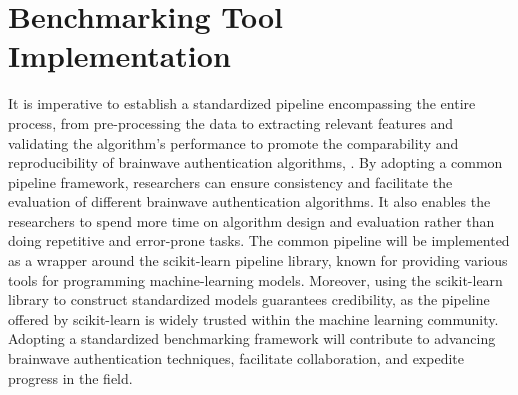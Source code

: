 \chapter{Benchmarking Tool Implementation}
\label{ch:Framework}

It is imperative to establish a standardized pipeline encompassing the entire process, from pre-processing the data to extracting relevant features and validating the algorithm's performance to promote the comparability and reproducibility of brainwave authentication algorithms, \cite{moabb}. By adopting a common pipeline framework, researchers can ensure consistency and facilitate the evaluation of different brainwave authentication algorithms. It also enables the researchers to spend more time on algorithm design and evaluation rather than doing repetitive and error-prone tasks. The common pipeline will be implemented as a wrapper around the scikit-learn pipeline library, known for providing various tools for programming machine-learning models. Moreover, using the scikit-learn library to construct standardized models guarantees credibility, as the pipeline offered by scikit-learn is widely trusted within the machine learning community. Adopting a standardized benchmarking framework will contribute to advancing brainwave authentication techniques, facilitate collaboration, and expedite progress in the field. 


